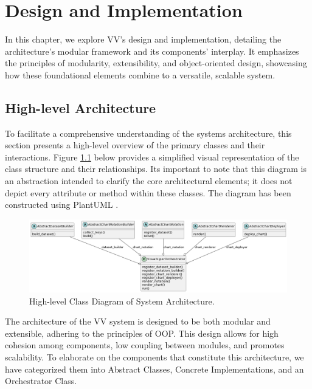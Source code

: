 \chapter{Design and Implementation}\label{system-architecture}

\minitoc

In this chapter, we explore VV's design and implementation, detailing the architecture's modular framework and its components' interplay. It emphasizes the principles of modularity, extensibility, and object-oriented design, showcasing how these foundational elements combine to a versatile, scalable system.

\section{High-level Architecture}\label{high-level-architecture}

To facilitate a comprehensive understanding of the
system\textquotesingle s architecture, this section presents a
high-level overview of the primary classes and their interactions.
Figure \ref{fig:class_diag1} below provides a simplified visual representation of the class
structure and their relationships. It\textquotesingle s important to
note that this diagram is an abstraction intended to clarify the core
architectural elements; it does not depict every attribute or method
within these classes. The diagram has been constructed using PlantUML
\cite{48}.

\begin{figure}[ht]
  \centering
  \includegraphics[width=\textwidth]{media/fig8.png}
  \caption{High-level Class Diagram of System Architecture.}
  \label{fig:class_diag1}
\end{figure}

The architecture of the VV system is designed to be both modular and
extensible, adhering to the principles of OOP. This design allows for
high cohesion among components, low coupling between modules, and
promotes scalability. To elaborate on the components that constitute
this architecture, we have categorized them into Abstract Classes,
Concrete Implementations, and an Orchestrator Class.

